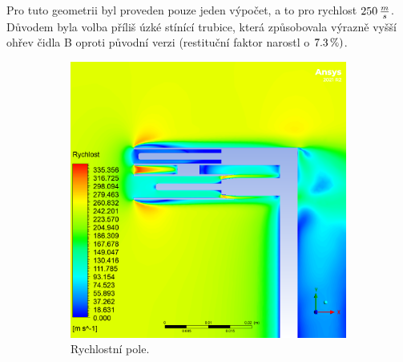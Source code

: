         Pro tuto geometrii byl proveden pouze jeden výpočet, a to pro rychlost $250 \, \frac{m}{s}$. Důvodem byla volba příliš úzké stínící trubice, která způsobovala výrazně vyšší ohřev čidla B oproti původní verzi (restituční faktor narostl o $7.3 \, \%)$. 

        \begin{figure}[ht!]
            \centering
            \begin{subfigure}{0.45\textwidth}
                \centering
                \captionsetup{width=.9\linewidth}
                \includegraphics[width=\textwidth]{400_SIMULACE_KONSTRUKCNICH_UPRAV/Vizualizace/sonda_se_stinenim_B_vizualizace_rychlost.png}
                \caption{Rychlostní pole.}
            \end{subfigure}
            \begin{subfigure}{0.45\textwidth}
                \centering
                \captionsetup{width=.9\linewidth}

\end{subfigure}
\end{figure}
